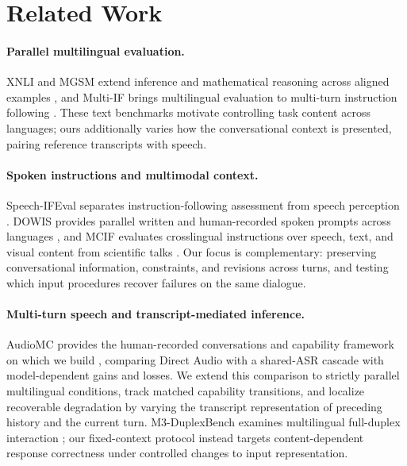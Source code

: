 \documentclass{article}
\begin{document}
\section{Related Work}

\paragraph{Parallel multilingual evaluation.}
XNLI and MGSM extend inference and mathematical reasoning across aligned examples \citep{conneau2018xnli,shi2023language}, and Multi-IF brings multilingual evaluation to multi-turn instruction following \citep{he2024multiif}. These text benchmarks motivate controlling task content across languages; ours additionally varies how the conversational context is presented, pairing reference transcripts with speech.

\paragraph{Spoken instructions and multimodal context.}
Speech-IFEval separates instruction-following assessment from speech perception \citep{lu2025speechifeval}. DOWIS provides parallel written and human-recorded spoken prompts across languages \citep{zufle2026dowis}, and MCIF evaluates crosslingual instructions over speech, text, and visual content from scientific talks \citep{papi2026mcif}. Our focus is complementary: preserving conversational information, constraints, and revisions across turns, and testing which input procedures recover failures on the same dialogue.

\paragraph{Multi-turn speech and transcript-mediated inference.}
AudioMC provides the human-recorded conversations and capability framework on which we build \citep{gosai2026audiomultichallenge}, comparing Direct Audio with a shared-ASR cascade with model-dependent gains and losses. We extend this comparison to strictly parallel multilingual conditions, track matched capability transitions, and localize recoverable degradation by varying the transcript representation of preceding history and the current turn. M3-DuplexBench examines multilingual full-duplex interaction \citep{fukuda2026m3duplexbench}; our fixed-context protocol instead targets content-dependent response correctness under controlled changes to input representation.
\end{document}
